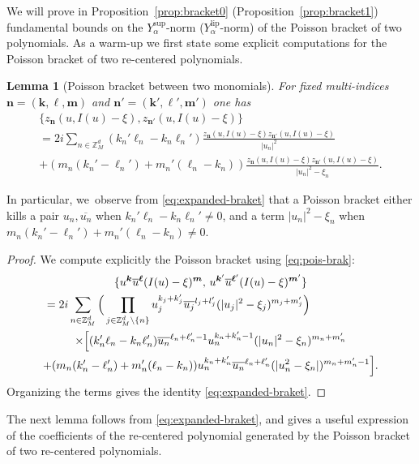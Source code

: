 \documentclass[JEP,XML,SOM,Unicode,published]{cedram}
\theoremstyle{plain}
\newtheorem{lemma}[theorem]{Lemma}
\theoremstyle{definition}
\newcommand{\nb}{{\boldsymbol n}}
\newcommand{\kb}{{\boldsymbol k}}
\newcommand{\lb}{{\boldsymbol \ell}}
\newcommand{\mb}{{\boldsymbol m}}
\newcommand{\Z}{\mathbb{Z}}
\newcommand{\1}{\mathbf{1}}
\newcommand{\Ysup}[1]{Y_{#1}^{\mathrm{sup}}}
\newcommand{\Ylip}[1]{Y_{#1}^{\mathrm{lip}}}
\begin{document}
We will prove in Proposition~\ref{prop:bracket0} (\resp Proposition~\ref{prop:bracket1}) fundamental bounds on the $\Ysup{\alpha}$-norm ($\Ylip{\alpha}$-norm) of the Poisson bracket of two polynomials. As a warm-up we first state some explicit computations for the Poisson bracket of two re-centered polynomials.
\begin{lemma}[Poisson bracket between two monomials]
For fixed multi-indices $\nb=(\kb,\lb,\mb)$ and $\nb'=(\kb',\lb',\mb')$ one has
\begin{multline}
\label{eq:expanded-braket}
\{z_{\nb}(u,I(u)-\xi),z_{\nb'}(u,I(u)-\xi)\}\\
= 2i\sum_{n\in\Z_{M}^{d}}
(k_n'\ell_n-k_n\ell_n')
\frac{z_{\nb}(u,I(u)-\xi)z_{\nb'}(u,I(u)-\xi)}{|u_n|^2} \\
+
(m_n(k_n'-\ell_n')
+m_n'(\ell_n-k_n))
\frac{z_{\nb}(u,I(u)-\xi)z_{\nb'}(u,I(u)-\xi)}{|u_{n}|^{2}-\xi_{n}}.
\end{multline}
\end{lemma}
In particular, we~observe from \eqref{eq:expanded-braket} that a Poisson bracket either kills a pair $u_n,\overline{u_{n}}$ when $k_n'\ell_n-k_n\ell_n'\neq0$, and a term $|u_{n}|^{2}-\xi_{n}$ when $m_n(k_n'-\ell_n')+m_n'(\ell_n-k_n)\neq 0$.
\begin{proof}
We compute explicitly the Poisson bracket using \eqref{eq:pois-brak}:
\begin{multline*}
\{u^{\kb}\overline{u}^\lb(I(u)-\xi)^{\mb},\,
u^{\kb'}\overline{u}^{\lb'}(I(u)-\xi)^{\mb'}
\} \\\hspace*{-2cm}
=2i\sum_{n\in\Z_{M}^{d}}
\Big(
\prod_{j\in\Z_{M}^{d}\setminus\{n\}}
u_j^{k_j+k_j'}
\overline{u_{j}}^{l_j+l_j'}
(|u_{j}|^{2}-\xi_{j})^{m_j+m_j'}
\Big)\\
\times \Big[
(k_n'\ell_n-k_n\ell_n')
\overline{u_{n}}^{\ell_n+\ell_n'-1}
u_n^{k_n+k_n'-1}
(|u_{n}|^{2}-\xi_{n})^{m_n+m_n'}
\\
+ (m_n(k_n'-\ell_n')+m_n'(\ell_n-k_n))
u_n^{k_n+k_n'}
\overline{u_{n}}^{\ell_n+\ell_n'}
(|u_{n}^{2}-\xi_{n}|)^{m_n+m_n'-1}
\Big].
\end{multline*}
Organizing the terms gives the identity \eqref{eq:expanded-braket}.
\end{proof}
The next lemma follows from \eqref{eq:expanded-braket}, and gives a useful expression of the coefficients of the re-centered polynomial generated by the Poisson bracket of two re-centered polynomials.
\end{document}
